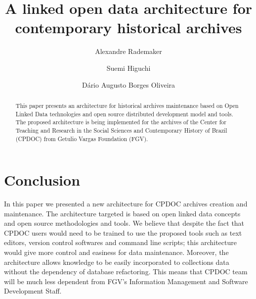 \documentclass{llncs}
\begin{document}
\title{A linked open data architecture for contemporary historical archives}  
\author{Alexandre Rademaker 
  \and Suemi Higuchi
  \and D\'ario Augusto Borges Oliveira}
\maketitle

\begin{abstract}
  This paper presents an architecture for historical archives
  maintenance based on Open Linked Data technologies and open source
  distributed development model and tools. The proposed architecture
  is being implemented for the archives of the Center for Teaching and
  Research in the Social Sciences and Contemporary History of Brazil
  (CPDOC) from Getulio Vargas Foundation (FGV).
\end{abstract}








\section{Conclusion}

In this paper we presented a new architecture for CPDOC archives
creation and maintenance. The architecture targeted is based on open
linked data concepts and open source methodologies and tools. We
believe that despite the fact that CPDOC users would need to be
trained to use the proposed tools such as text editors, version
control softwares and command line scripts; this architecture would
give more control and easiness for data maintenance. Moreover, the
architecture allows knowledge to be easily incorporated to collections
data without the dependency of database refactoring. This means that
CPDOC team will be much less dependent from FGV's Information
Management and Software Development Staff.
\end{document}
